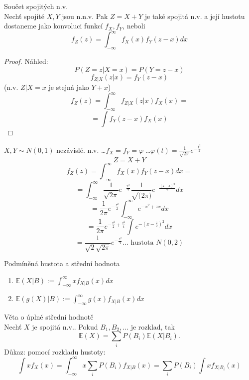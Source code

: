 \documentclass[../main.tex]{subfiles}
\begin{document}
\begin{theorem}
    Součet spojitých n.v.\\

    Nechť spojité $X,Y$ jsou n.n.v. Pak $Z = X+Y$ je také spojitá n.v. a její hustotu dostaneme jako konvoluci funkcí $f_X,f_Y$, neboli
    \[f_Z(z) = \int^\infty_{-\infty}f_X(x)f_Y(z-x)dx\]
    \begin{proof}
        Náhled: \[P(Z=z | X=x) = P(Y = z-x)\]
        \[f_{Z|X}(z|x) = f_Y(z-x)\]
        (n.v. $Z|X=x$ je stejná jako $Y+x$)
        \[f_Z(z) = \int^\infty_{-\infty} f_{Z|X} (z|x)f_X(x) =\]
        \[=\int f_Y(z-x)f_X(x)\]
    \end{proof}
\end{theorem}

\begin{example}
    $X,Y \sim N(0,1)$ nezávislé. n.v. \dots $f_X = f_Y = \varphi$ \dots $\varphi(t) = \frac{1}{\sqrt{2\pi}}e^{-\frac{t^2}{2}}$
    \[Z = X+Y\]
    \[f_Z(z) = \int^\infty_{-\infty} f_X(x)f_Y(z-x)dx=\]
    \[= \int^\infty_{-\infty} \frac{1}{\sqrt{2\pi}} e^{-\frac{x^2}{2}} \frac{1}{\sqrt(2\pi)}e^{-\frac{(z-x)^2}{2}}dx\]
    \[= \frac{1}{2\pi} e^{-\frac{z^2}{2}}\int^\infty_{-\infty}e^{-x^2 + zx}dx\]
    \[= \frac{1}{2\pi} e^{-\frac{z^2}{2}+\frac{z^2}{4}} \int e^{-(x-\frac{z}{2})^2}dx\]
    \[= \frac{1}{\sqrt{2}\sqrt{2\pi}} e^{-\frac{z^2}{4}} \dots \text{ hustota } N(0,2) \]
\end{example}

\begin{definition}
    Podmíněná hustota a střední hodnota\\

    \begin{enumerate}
        \item $\mathbb{E}(X|B) := \int^\infty_{-\infty} xf_{X|B}(x)dx$
        \item $\mathbb{E}(g(X)|B):=\int^\infty_{-\infty}g(x)f_{X|B}(x)dx$
    \end{enumerate}
\end{definition}
\begin{theorem}
    Věta o úplné střední hodnotě\\

    Nechť $X$ je spojitá n.v.. Pokud $B_1,B_2,\dots$ je rozklad, tak
    \[\mathbb{E}(X) = \sum_i P(B_i)\mathbb{E}(X|B_i).\]
    Důkaz: pomocí rozkladu hustoty:
    \[\int xf_X(x) = \int^\infty_{-\infty} x\sum_i P(B_i) f_{X|B}(x) = \sum_i P(B_i) \int x f_{X|B_i} (x)\]
\end{theorem}
\end{document}
